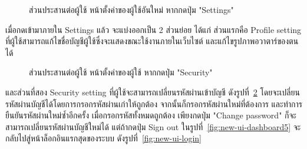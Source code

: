 \documentclass[12pt,one side,openright,a4paper]{cpe-thesis-th}
\newcommand{\thaijustify}[1]{%
  \par\hspace{30pt}\justifying
  #1
}
\begin{document}
\begin{figure}[H]
  \centering
  \caption[ส่วนประสานต่อผู้ใช้ หน้าตั้งค่าของผู้ใช้อันใหม่ (กดปุ่ม "Settings")]{ส่วนประสานต่อผู้ใช้ หน้าตั้งค่าของผู้ใช้อันใหม่ หากกดปุ่ม "Settings"}
  \label{fig:new-ui-setting1}
\end{figure}
\thaijustify{
  เมื่อกดเข้ามาภายใน Settings แล้ว จะแบ่งออกเป็น 2 ส่วนย่อย ได้แก่ ส่วนแรกคือ Profile setting ที่ผู้ใช้สามารถแก้ไขชื่อบัญชีผู้ใช้ซึ่งจะแสดงขณะใช้งานภายในเว็บไซต์ และแก้ไขรูปภาพอวาตาร์ของตนได้
}
\begin{figure}[H]
  \centering
  \caption[ส่วนประสานต่อผู้ใช้ หน้าตั้งค่าของผู้ใช้ (กดปุ่ม "Security")]{ส่วนประสานต่อผู้ใช้ หน้าตั้งค่าของผู้ใช้ หากกดปุ่ม "Security"}
  \label{fig:new-ui-setting2}
\end{figure}
\thaijustify{
  และส่วนที่สอง Security setting ที่ผู้ใช้จะสามารถเปลี่ยนรหัสผ่านเข้าบัญชี ดังรูปที่~\ref{fig:new-ui-setting2} โดยจะเปลี่ยนรหัสผ่านบัญชีได้โดยการกรอกรหัสผ่านเก่าให้ถูกต้อง จากนั้นก็กรอกรหัสผ่านใหม่ที่ต้องการ และทำการยืนยันรหัสผ่านใหม่ซ้ำอีกครั้ง เมื่อกรอกรหัสทั้งหมดถูกต้อง เพียงกดปุ่ม "Change password" ก็จะสามารถเปลี่ยนรหัสผ่านบัญชีใหม่ได้ แต่ถ้ากดปุ่ม Sign out ในรูปที่~\ref{fig:new-ui-dashboard5} จะกลับไปสู่หน้าล็อกอินแรกสุดของระบบ ดังรูปที่~\ref{fig:new-ui-login}
}
\end{document}
